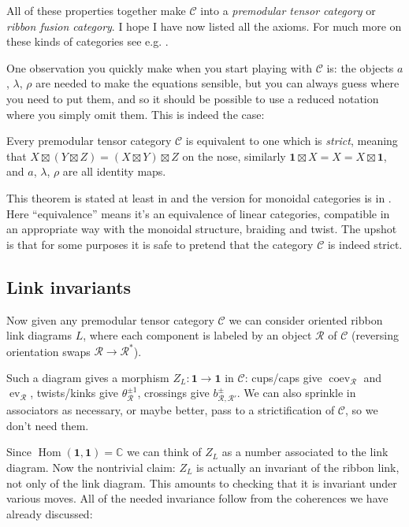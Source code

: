 \documentclass[12pt,letterpaper,reqno]{amsart}
\numberwithin{equation}{section}
\newcommand{\cC}{\ensuremath{\mathcal C}}
\newcommand{\bbC}{\ensuremath{\mathbb C}}
\newcommand\bid{{\mathbf 1}}
\newcommand{\vrep}{\mathcal{R}}
\newcommand{\ti}[1]{\textit{#1}}
\DeclareMathOperator{\Hom}{Hom}
\DeclareMathOperator{\ev}{ev}
\DeclareMathOperator{\coev}{coev}
\begin{document}
All of these properties together make $\cC$ into 
a \ti{premodular tensor category} or \ti{ribbon fusion category}.
I hope I have now listed all the axioms. For much more on these
kinds of categories see e.g. \cite{Mueger2012,BK2001,EGNO2015}.

One observation you quickly make when you start playing with $\cC$
is: the objects $a$, $\lambda$, $\rho$ are needed to make the 
equations sensible, but you can always guess where you need to put
them, and so it should be possible to use a reduced notation where
you simply omit them. This is indeed the case:

\begin{thm} Every premodular tensor category $\cC$ is equivalent to
one which is \ti{strict}, meaning that $X \boxtimes (Y \boxtimes Z) = (X \boxtimes Y) \boxtimes Z$ on the nose, similarly $\bid \boxtimes X = X = X \boxtimes \bid$, and $a$, $\lambda$, $\rho$ are all identity maps.
\end{thm}

This theorem is stated at least in \cite{Turaev1992ModularCategories}
and the version for monoidal categories is in \cite{EGNO2015}.
Here ``equivalence'' means it's an equivalence of linear categories,
compatible in an appropriate way with the monoidal structure, 
braiding and twist.
The upshot is that for some purposes it is safe to pretend that the 
category $\cC$ is indeed strict.


\subsection{Link invariants}

Now given any premodular tensor category $\cC$
we can consider oriented ribbon link diagrams $L$,
where each component is labeled by an object $\vrep$ of $\cC$ (reversing orientation
swaps $\vrep \to \vrep^*$).

Such a diagram gives a morphism $Z_L: \bid \to \bid$ in $\cC$:
cups/caps give $\coev_\vrep$ and $\ev_\vrep$, 
twists/kinks give $\theta_\vrep^{\pm 1}$,
crossings give $b^\pm_{\vrep,\vrep'}$.
We can also sprinkle in associators as necessary, or maybe better,
pass to a strictification of $\cC$, so we don't need them.

Since $\Hom(\bid,\bid) = \bbC$ 
we can think of $Z_L$ as a number associated to the 
link diagram. 
Now the nontrivial claim: $Z_L$
is actually an invariant of the ribbon link, not only of the link
diagram.
This amounts to checking that it is invariant under various moves.
All of the needed invariance follow from the coherences we have
already discussed:
\end{document}
